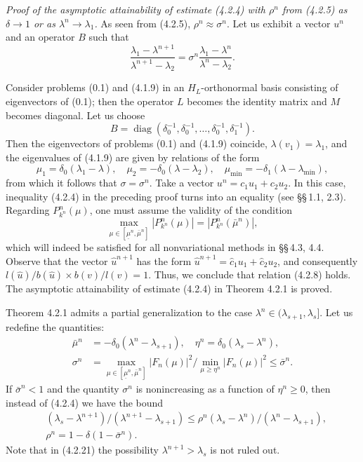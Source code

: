 \documentclass[11pt,oneside]{book}
\newcommand{\diag}{\operatorname{diag}}
\begin{document}
\textit{Proof of the asymptotic attainability of estimate (4.2.4) with $\rho^n$ from (4.2.5) as $\delta \to 1$ or as $\lambda^n \to \lambda_1$.} As seen from (4.2.5), $\rho^n \approx \sigma^n$. Let us exhibit a vector $u^n$ and an operator $B$ such that
\[
\frac{\lambda_1 - \lambda^{n+1}}{\lambda^{n+1} - \lambda_2} = \sigma^n \frac{\lambda_1 - \lambda^n}{\lambda^n - \lambda_2}. \tag{4.2.18}
\]

Consider problems (0.1) and (4.1.9) in an $H_L$-orthonormal basis consisting of eigenvectors of (0.1); then the operator $L$ becomes the identity matrix and $M$ becomes diagonal. Let us choose
\[
B = \diag(\delta_0^{-1}, \delta_0^{-1}, \ldots, \delta_0^{-1}, \delta_1^{-1}).
\]
Then the eigenvectors of problems (0.1) and (4.1.9) coincide, $\lambda(v_1) = \lambda_1$, and the eigenvalues of (4.1.9) are given by relations of the form
\[
\mu_1 = \delta_0 (\lambda_1 - \lambda), \quad \mu_2 = - \delta_0 (\lambda - \lambda_2), \quad \mu_{\min} = - \delta_1 (\lambda - \lambda_{\min}),
\]
from which it follows that $\sigma = \sigma^n$. Take a vector $u^n = c_1 u_1 + c_2 u_2$. In this case, inequality (4.2.4) in the preceding proof turns into an equality (see \S\S\,1.1, 2.3). Regarding $P_{k^n}^n(\mu)$, one must assume the validity of the condition %
\[
\max_{\mu \in [\underline{\mu}^n, \bar{\mu}^n]} |P_{k^n}^n(\mu)| = |P_{k^n}^n(\bar{\mu}^n)|, \tag{4.2.19}
\]
which will indeed be satisfied for all nonvariational methods in \S\S\,4.3, 4.4. Observe that the vector $\hat{u}^{n+1}$ has the form $\hat{u}^{n+1} = \hat{c}_1 u_1 + \hat{c}_2 u_2$, and consequently $l(\hat{u}) / b(\hat{u}) \times b(v) / l(v) = 1$. Thus, we conclude that relation (4.2.8) holds. The asymptotic attainability of estimate (4.2.4) in Theorem 4.2.1 is proved. %

Theorem 4.2.1 admits a partial generalization to the case $\lambda^n \in (\lambda_{s+1}, \lambda_s]$. Let us redefine the quantities:
\[
\begin{aligned}
\bar{\mu}^n &= - \delta_0 (\lambda^n - \lambda_{s+1}), \quad \eta^n = \delta_0 (\lambda_s - \lambda^n), \\
\sigma^n &= \max_{\mu \in [\underline{\mu}^n, \bar{\mu}^n]} |F_n(\mu)|^2 \Big/ \min_{\mu \geqslant \eta^n} |F_n(\mu)|^2 \leqslant \bar{\sigma}^n.
\end{aligned}
\tag{4.2.20}
\]
If $\bar{\sigma}^n < 1$ and the quantity $\sigma^n$ is nonincreasing as a function of $\eta^n \geqslant 0$, then instead of (4.2.4) we have the bound
\[
\begin{aligned}
&(\lambda_s - \lambda^{n+1}) / (\lambda^{n+1} - \lambda_{s+1}) \leqslant \rho^n (\lambda_s - \lambda^n) / (\lambda^n - \lambda_{s+1}), \\
&\rho^n = 1 - \delta (1 - \bar{\sigma}^n).
\end{aligned}
\tag{4.2.21}
\]
Note that in (4.2.21) the possibility $\lambda^{n+1} > \lambda_s$ is not ruled out.
\end{document}
